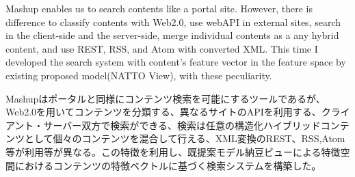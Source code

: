 
\begin{eabstract}
Mashup enables us to search contents like a portal site. However, there is difference to classify contents with Web2.0, use webAPI in external sites, search in the client-side and  the server-side, merge individual contents as a any hybrid content, and use REST, RSS, and Atom with converted XML. This time I developed the search system with content's feature vector in the feature space by existing proposed model(NATTO View), with these peculiarity.
\end{eabstract}

\begin{jabstract}
Mashupはポータルと同様にコンテンツ検索を可能にするツールであるが、Web2.0を用いてコンテンツを分類する、異なるサイトのAPIを利用する、クライアント・サーバー双方で検索ができる、検索は任意の構造化ハイブリッドコンテンツとして個々のコンテンツを混合して行える、XML変換のREST、RSS,Atom等が利用等が異なる。この特徴を利用し、既提案モデル納豆ビューによる特徴空間におけるコンテンツの特徴ベクトルに基づく検索システムを構築した。
\end{jabstract}

